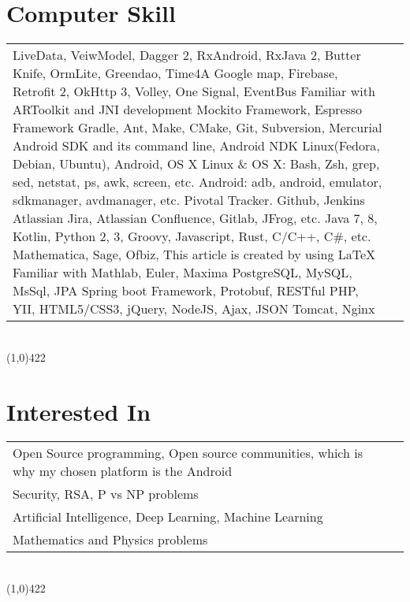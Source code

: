 \documentclass[10pt]{article}
\newcommand\HRule{\hspace*{.8cm}\line(1,0){422}\\}
\newenvironment{Record}[1]
{
    \vspace{-0.5cm}
    \section*{#1}
        \vspace{0.1cm}
        \begin{tabular}
}
{
        \end{tabular}\\
        \HRule
}
\newcommand\subsubsectionstyle{\scriptsize\texttt\subsubsectionfont}
\begin{document}
\begin{Record}{Computer Skill}{l l}
    \ComputerSkill{Android Library}
        {LiveData, VeiwModel, Dagger 2, RxAndroid, RxJava 2, Butter Knife, OrmLite, Greendao, Time4A}
        {Google map, Firebase, Retrofit 2, OkHttp 3, Volley, One Signal, EventBus}
        {Familiar with ARToolkit and JNI development}{}{}%
    \ComputerSkill{Android Test Library}
        {Mockito Framework, Espresso Framework}{}{}{}{}%
    \ComputerSkill{Tool}
        {Gradle, Ant, Make, CMake, Git, Subversion, Mercurial}
        {Android SDK and its command line, Android NDK}{}{}{}%
    \ComputerSkill{Operating System}
        {Linux(Fedora, Debian, Ubuntu), Android, OS X}{}{}{}{}%
    \ComputerSkill{Operating System tool}
        {Linux \& OS X: Bash, Zsh, grep, sed, netstat, ps, awk, screen, etc.}
        {Android: adb, android, emulator, sdkmanager, avdmanager, etc.}{}{}{}%
    \ComputerSkill{Development tool}
        {Pivotal Tracker. Github, Jenkins}
        {Atlassian Jira, Atlassian Confluence, Gitlab, JFrog, etc.}{}{}{}%
    \ComputerSkill{Language}
        {Java 7, 8, Kotlin, Python 2, 3, Groovy, Javascript, Rust, C/C++, C\#, etc.}
        {}{}{}{}%
    \ComputerSkill{Special Software}
        {Mathematica, Sage, Ofbiz, This article is created by using \LaTeX}
        {Familiar with Mathlab, Euler, Maxima}{}{}{}%
    \ComputerSkill{Back-End Development}
        {PostgreSQL, MySQL, MsSql, JPA}
        {Spring boot Framework, Protobuf, RESTful}
        {PHP, YII, HTML5/CSS3, jQuery, NodeJS, Ajax, JSON}
        {Tomcat, Nginx}{}%
\end{Record}

\newcommand{\InterestedIn}[1]{
    \subsubsectionstyle #1\\
}
\begin{Record}{Interested In}{l l}
    \InterestedIn{Open Source programming, Open source communities, which is why my chosen platform is the Android}%
    \InterestedIn{Security, RSA, P vs NP problems}%
    \InterestedIn{Artificial Intelligence, Deep Learning, Machine Learning}%
    \InterestedIn{Mathematics and Physics problems}%
\end{Record}


\newcommand{\Education}[9]{
\subsectionfont{#1}&\subsubsectionstyle{#2}&\subsubsectionstyle{#3}&\subsubsectionstyle{#6}&\subsubsectionstyle{#7}\\
}
\end{document}
